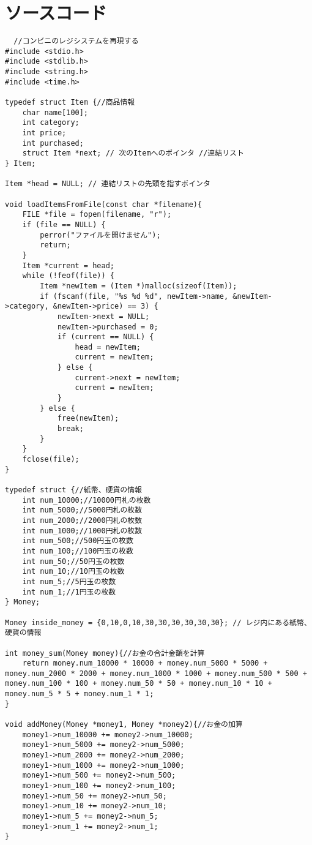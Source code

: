 \documentclass[a4j,11pt]{jarticle}
\begin{document}
\section{ソースコード}
\fontsize{4pt}{10pt}\selectfont
\begin{lstlisting}
  //コンビニのレジシステムを再現する
#include <stdio.h>
#include <stdlib.h>
#include <string.h>
#include <time.h>

typedef struct Item {//商品情報
    char name[100];
    int category;
    int price;
    int purchased;
    struct Item *next; // 次のItemへのポインタ //連結リスト
} Item;

Item *head = NULL; // 連結リストの先頭を指すポインタ

void loadItemsFromFile(const char *filename){
    FILE *file = fopen(filename, "r");
    if (file == NULL) {
        perror("ファイルを開けません");
        return;
    }
    Item *current = head;
    while (!feof(file)) {
        Item *newItem = (Item *)malloc(sizeof(Item));
        if (fscanf(file, "%s %d %d", newItem->name, &newItem->category, &newItem->price) == 3) {
            newItem->next = NULL;
            newItem->purchased = 0;
            if (current == NULL) {
                head = newItem;
                current = newItem;
            } else {
                current->next = newItem;
                current = newItem;
            }
        } else {
            free(newItem);
            break;
        }
    }
    fclose(file);
}

typedef struct {//紙幣、硬貨の情報
    int num_10000;//10000円札の枚数
    int num_5000;//5000円札の枚数
    int num_2000;//2000円札の枚数
    int num_1000;//1000円札の枚数
    int num_500;//500円玉の枚数
    int num_100;//100円玉の枚数
    int num_50;//50円玉の枚数
    int num_10;//10円玉の枚数
    int num_5;//5円玉の枚数
    int num_1;//1円玉の枚数
} Money;

Money inside_money = {0,10,0,10,30,30,30,30,30,30}; // レジ内にある紙幣、硬貨の情報

int money_sum(Money money){//お金の合計金額を計算
    return money.num_10000 * 10000 + money.num_5000 * 5000 + money.num_2000 * 2000 + money.num_1000 * 1000 + money.num_500 * 500 + money.num_100 * 100 + money.num_50 * 50 + money.num_10 * 10 + money.num_5 * 5 + money.num_1 * 1;
}

void addMoney(Money *money1, Money *money2){//お金の加算
    money1->num_10000 += money2->num_10000;
    money1->num_5000 += money2->num_5000;
    money1->num_2000 += money2->num_2000;
    money1->num_1000 += money2->num_1000;
    money1->num_500 += money2->num_500;
    money1->num_100 += money2->num_100;
    money1->num_50 += money2->num_50;
    money1->num_10 += money2->num_10;
    money1->num_5 += money2->num_5;
    money1->num_1 += money2->num_1;
}


\end{lstlisting}
\end{document}
